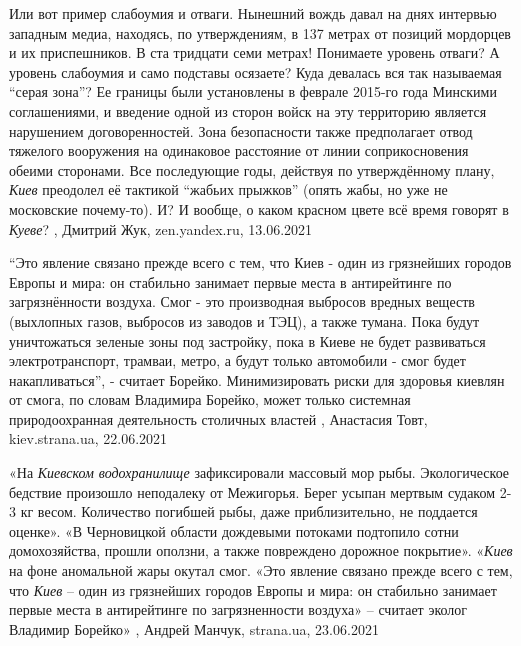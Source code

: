 Или вот пример слабоумия и отваги. Нынешний вождь давал на днях интервью
западным медиа, находясь, по утверждениям, в 137 метрах от позиций мордорцев и
их приспешников. В ста тридцати семи метрах! Понимаете уровень отваги? А
уровень слабоумия и само подставы осязаете? Куда девалась вся так называемая
\enquote{серая зона}? Ее границы были установлены в феврале 2015-го года Минскими
соглашениями, и введение одной из сторон войск на эту территорию является
нарушением договоренностей. Зона безопасности также предполагает отвод тяжелого
вооружения на одинаковое расстояние от линии соприкосновения обеими сторонами.
Все последующие годы, действуя по утверждённому плану, \emph{Киев} преодолел её
тактикой \enquote{жабьих прыжков} (опять жабы, но уже не московские почему-то). И? И
вообще, о каком красном цвете всё время говорят в \emph{Куеве}?
, 
Дмитрий Жук, zen.yandex.ru, 13.06.2021

\enquote{Это явление связано прежде всего с тем, что Киев - один из грязнейших городов
Европы и мира: он стабильно занимает первые места в антирейтинге по
загрязнённости воздуха. Смог - это производная выбросов вредных веществ
(выхлопных газов, выбросов из заводов и ТЭЦ), а также тумана. Пока будут
уничтожаться зеленые зоны под застройку, пока в Киеве не будет развиваться
электротранспорт, трамваи, метро, а будут только автомобили - смог будет
накапливаться}, - считает Борейко.  Минимизировать риски для здоровья киевлян
от смога, по словам Владимира Борейко, может только системная природоохранная
деятельность столичных властей
  , Анастасия Товт, kiev.strana.ua, 22.06.2021


«На \emph{Киевском водохранилище} зафиксировали массовый мор рыбы. Экологическое
бедствие произошло неподалеку от Межигорья. Берег усыпан мертвым судаком 2-3 кг
весом. Количество погибшей рыбы, даже приблизительно, не поддается оценке».  «В
Черновицкой области дождевыми потоками подтопило сотни домохозяйства, прошли
оползни, а также повреждено дорожное покрытие».  «\emph{Киев} на фоне аномальной жары
окутал смог. «Это явление связано прежде всего с тем, что \emph{Киев} – один из
грязнейших городов Европы и мира: он стабильно занимает первые места в
антирейтинге по загрязненности воздуха» – считает эколог Владимир Борейко»
, 
Андрей Манчук, strana.ua, 23.06.2021


